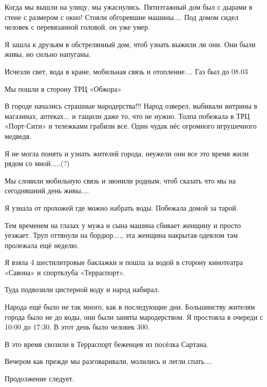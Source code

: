 Когда мы вышли на улицу, мы ужаснулись. Пятиэтажный дом был с дырами в стене с
размером с окно!  Стояли обгоревшие машины.... Под домом сидел человек с
перевязанной головой, он уже умер.  

Я зашла к друзьям в обстрелянный дом, чтоб узнать выжили ли они. Они были живы,
но сильно напуганы. 

Исчезли свет, вода в кране, мобильная связь и отопление.... Газ был до 08.03

Мы пошли в сторону ТРЦ «Обжора»

В городе начались страшные мародерства!!! Народ озверел, выбивали витрины в
магазинах, аптеках... и тащили даже то, что не нужно. Толпа побежала в ТРЦ
«Порт-Сити» и тележками грабили все. Один чудак нёс огромного игрушечного
медведя. 

Я не могла понять и узнать жителей города, неужели они все это время жили рядом
со мной.....(?)

Мы словили мобильную связь и звонили родным, чтоб сказать что мы на сегодняшний
день живы....

Я узнала от прохожей где можно набрать воды. Побежала домой за тарой. 

Тем временем на глазах у мужа и сына машина сбивает женщину и просто уезжает.
Труп оттянули на бордюр...., эта женщина накрытая одеялом там пролежала ещё
неделю. 

Я взяла 4 шестилитровые баклажки и пошла за водой в сторону кинотеатра «Савона»
и спортклуба «Терраспорт». 

Туда подвозили цистерной воду и народ набирал. 

Народа ещё было не так много, как в последующие дни. Большинству жителям города
было не до воды, они были заняты мародерством. Я простояла в очереди с 10:00 до
17:30. В этот день было человек 300.

В это время свозили в Терраспорт беженцев из посёлка Сартана. 

Вечером как прежде мы разговаривали, молились и легли спать....

Продолжение следует.

